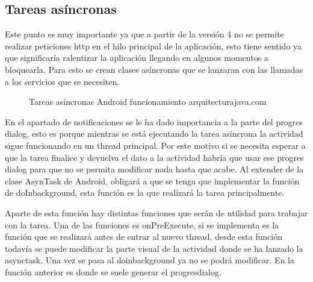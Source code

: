\subsection{Tareas asíncronas}
\label{subsecc:Tareas asíncronas}

Este punto es muy importante ya que a partir de la versión 4 no se permite realizar peticiones http en el hilo principal de la aplicación, esto tiene sentido ya que significaría ralentizar la aplicación llegando en algunos momentos a bloquearla.
Para esto se crean clases asíncronas que se lanzaran con las llamadas a los servicios que se necesiten.
\newpage
\begin{figure}[H] 
  \begin{center} 
    \caption{Tareas asíncronas Android funcionamiento arquitecturajava.com} 
    \label{fig:TareasAsincronas} 
  \end{center} 
\end{figure}

En el apartado de notificaciones se le ha dado importancia a la parte del progres dialog, esto es porque mientras se está ejecutando la tarea asíncrona la actividad sigue funcionando en un thread principal. Por este motivo si se necesita esperar a que la tarea finalice y devuelva el dato a la actividad habría que usar ese progres dialog para que no se permita modificar nada hasta que acabe.
Al extender de la clase AsynTask de Android, obligará a que se tenga que implementar la función de doInbackground, esta función es la que realizará la tarea principalmente.

Aparte de esta función hay distintas funciones que serán de utilidad para trabajar con la tarea.
Una de las funciones es onPreExecute, si se implementa es la función que se realizará antes de entrar al nuevo thread, desde esta función todavía se puede modificar la parte visual de la actividad donde se ha lanzado la asynctask. Una vez se pasa al doinbackground ya no se podrá modificar.
En la función anterior es donde se suele generar el progresdialog.

